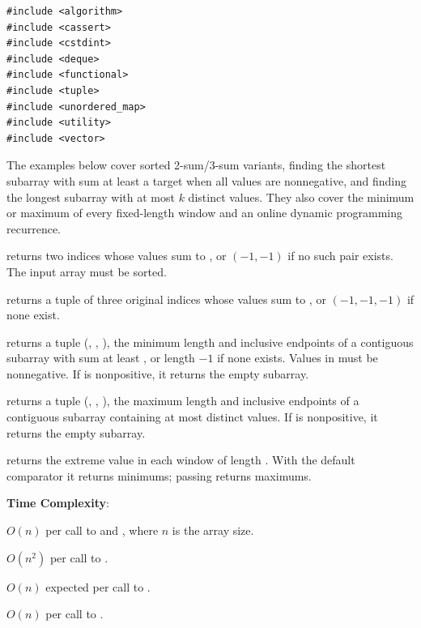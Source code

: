 \begin{lstlisting}[style=cpp]
#include <algorithm>
#include <cassert>
#include <cstdint>
#include <deque>
#include <functional>
#include <tuple>
#include <unordered_map>
#include <utility>
#include <vector>
\end{lstlisting}
The examples below cover sorted 2-sum/3-sum variants, finding the shortest subarray with sum at least a target when all values are nonnegative, and finding the longest subarray with at most $k$ distinct values. They also cover the minimum or maximum of every fixed-length window and an online dynamic programming recurrence.

\begin{compactitem}
  \item {} returns two indices whose values sum to , or $(-1, -1)$ if no such pair exists. The input array must be sorted.
  \item {} returns a tuple of three original indices whose values sum to , or $(-1, -1, -1)$ if none exist.
  \item {} returns a tuple (, , ), the minimum length and inclusive endpoints of a contiguous subarray with sum at least , or length $-1$ if none exists. Values in  must be nonnegative. If  is nonpositive, it returns the empty subarray.
  \item {} returns a tuple (, , ), the maximum length and inclusive endpoints of a contiguous subarray containing at most  distinct values. If  is nonpositive, it returns the empty subarray.
  \item {} returns the extreme value in each window of length . With the default  comparator it returns minimums; passing  returns maximums.
\end{compactitem}

\textbf{Time Complexity}:
\begin{compactitem}
  \item $O(n)$ per call to  and , where $n$ is the array size.
  \item $O(n^{2})$ per call to .
  \item $O(n)$ expected per call to .
  \item $O(n)$ per call to .
\end{compactitem}


